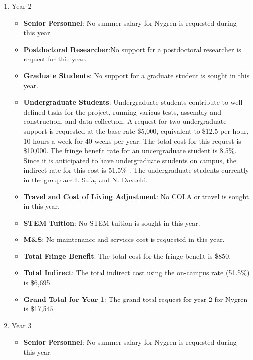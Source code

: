 \begin{enumerate}
\item{Year 2}
\begin{itemize}[noitemsep,nolistsep]
\item{{\bf Senior Personnel}: No summer salary for Nygren is requested during this year.}

\item {{\bf Postdoctoral Researcher}:No support for a postdoctoral researcher is request for this year.} 

\item{{\bf Graduate Students}: No support for a graduate student is sought in this year.}

\item {{\bf Undergraduate Students}: Undergraduate students contribute to well defined tasks for the project, running various tests, assembly and construction, and data collection.  A request for two undergraduate support is requested at the base rate \$5,000, equivalent to \$12.5 per hour, 10 hours a week for 40 weeks per year.  The total cost for this request is \$10,000.  The fringe benefit rate for an undergraduate student is 8.5\%.  Since it is anticipated to have undergraduate students on campus, the indirect rate for this cost is 51.5\% .  The undergraduate students currently in the group are I. Safa, and N. Davachi.}

\item{{\bf Travel and Cost of Living Adjustment}: No COLA or travel is sought in this year.}

\item {{\bf STEM Tuition}: No STEM tuition is sought in this year.}

\item {{\bf M\&S}: No maintenance and services cost is requested in this year.}

\item {{\bf Total Fringe Benefit}: The total cost for the fringe benefit is \$850.}

\item {{\bf Total Indirect}: The total indirect cost using the on-campus rate (51.5\%) is \$6,695.}

\item {{\bf Grand Total for Year 1}: The grand total request for year 2 for Nygren is \$17,545.}

\end{itemize}

\item{Year 3}
\begin{itemize}[noitemsep,nolistsep]
\item{{\bf Senior Personnel}: No summer salary for Nygren is requested during this year.}


\end{itemize}
\end{enumerate}
